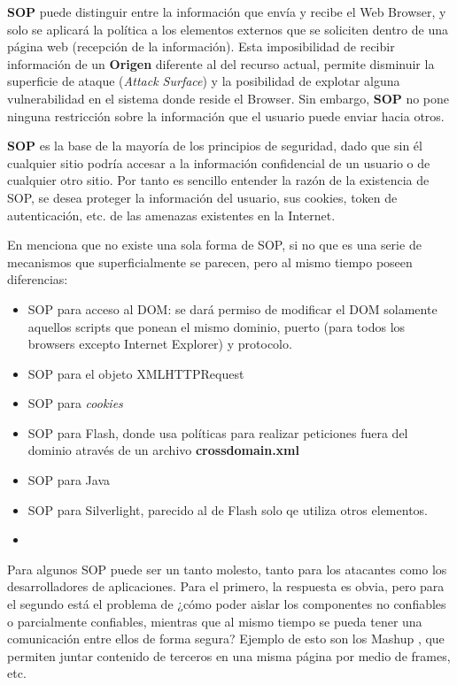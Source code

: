 \textbf{SOP} puede distinguir entre la información que envía y recibe el Web Browser, y solo se aplicará la política a los elementos externos que se soliciten dentro de una página web (recepción de la información). Esta imposibilidad de recibir información de un \textbf{Origen} diferente al del recurso actual, permite disminuir la superficie de ataque (\textit{Attack Surface}) y la posibilidad de explotar alguna vulnerabilidad en el sistema donde reside el Browser. Sin embargo, \textbf{SOP} no pone ninguna restricción sobre la información que el usuario puede enviar hacia otros. 

\textbf{SOP} es la base de la mayoría de los principios de seguridad, dado que sin él cualquier sitio podría accesar a la información confidencial de un usuario o de cualquier otro sitio. Por tanto es sencillo entender la razón de la existencia de SOP, se desea proteger la información del usuario, sus cookies, token de autenticación, etc. de las amenazas existentes en la Internet.


En \cite{Zalewsk08} menciona que no existe una sola forma de SOP, si no que es una serie de mecanismos que superficialmente se parecen, pero al mismo tiempo poseen diferencias:

\begin{itemize}
    \item SOP para acceso al DOM: se dará permiso de modificar el DOM solamente aquellos scripts que ponean el mismo dominio, puerto (para todos los browsers excepto Internet Explorer) y protocolo.
    \item SOP para el objeto XMLHTTPRequest
    \item SOP para \textit{cookies}
    \item SOP para Flash, donde usa políticas para realizar peticiones fuera del dominio através de un archivo \textbf{crossdomain.xml}
    \item SOP para Java
    \item SOP para Silverlight, parecido al de Flash solo qe utiliza otros elementos.
    \item 
\end{itemize}

    
Para algunos SOP puede ser un tanto molesto, tanto para los atacantes como los desarrolladores de aplicaciones. Para el primero, la respuesta es obvia, pero para el segundo está el problema de ¿cómo poder aislar los componentes no confiables o parcialmente confiables, mientras que al mismo tiempo se pueda tener una comunicación entre ellos de forma segura? Ejemplo de esto son los Mashup \cite{barth2009securing}, que permiten juntar contenido de terceros en una misma página por medio de frames, etc. 
    
